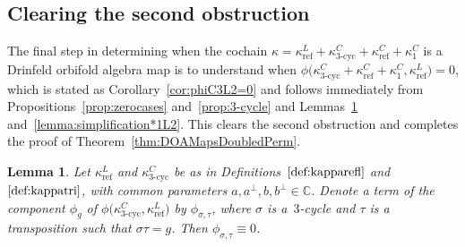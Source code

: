 \documentclass[10pt,a4paper]{amsart}
\numberwithin{equation}{section}
\newtheorem{Lemma}[Theorem]{Lemma}
\DeclareMathOperator{\refl}{ref}
\DeclareMathOperator{\tri}{3-cyc}
\begin{document}
\subsection{Clearing the second obstruction}%

The final step in determining when the cochain
$\kappa=\kappa^L_{\refl}+\kappa^C_{\tri}+\kappa^C_{\refl}+\kappa^C_1$
is a Drinfeld orbifold algebra map is to understand when
$\phi\big(\kappa^C_{\tri}+\kappa^C_{\refl}+\kappa^C_1,\kappa^L_{\refl}\big)=0$,
which is stated as Corollary~\ref{cor:phiC3L2=0} and follows immediately from
Propositions~\ref{prop:zerocases} and~\ref{prop:3-cycle} and Lemmas~\ref{lemma:simplificationC3L2}
and~\ref{lemma:simplification*1L2}. This clears the second obstruction and
completes the proof of Theorem~\ref{thm:DOAMapsDoubledPerm}.

\begin{Lemma}\label{lemma:simplificationC3L2}
Let $\kappa^L_{\refl}$ and $\kappa^C_{\tri}$ be as in Definitions~$\ref{def:kapparefl}$ and~$\ref{def:kappatri}$,
with common parameters $a, a^\perp, b, b^\perp \in \mathbb{C}$.
Denote a term of the component $\phi_g$ of $\phi\big(\kappa^C_{\tri},\kappa^L_{\refl}\big)$
by $\phi_{\sigma,\tau}$, where $\sigma$ is a~$3$-cycle and
$\tau$ is a transposition such that $\sigma \tau = g$. Then $\phi_{\sigma,\tau} \equiv 0$.
\end{Lemma}
\end{document}
